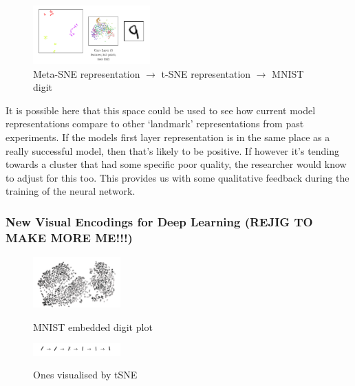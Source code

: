 \documentclass[a4paper,11pt,titlepage]{article}
\begin{document}
		\begin{figure}[H]
			\centering
						
    			\includegraphics[width=0.40\textwidth]{img/colah_meta_sne.png}
\caption{Meta-SNE representation $\rightarrow$ t-SNE representation $\rightarrow$ MNIST digit}
 		\end{figure}
 		
		It is possible here that this space could be used to see how current model representations compare to other `landmark' representations from past experiments. If the models first layer representation is in the same place as a really successful model, then that's likely to be positive. If however it's tending towards a cluster that had some specific poor quality, the researcher would know to adjust for this too. This provides us with some qualitative feedback during the training of the neural network. 
		

		
		
\subsubsection{New Visual Encodings for Deep 	Learning (REJIG TO MAKE MORE ME!!!)}
 			
	\begin{figure}[H]
    			\centering	
			{{\includegraphics[width=0.3\textwidth]
    				{img/hinton_embedded_tsne.png} 
    			}}%
    			\caption{MNIST embedded digit plot}%
    		\label{fig:mnistHinton}
	\end{figure}
 		
 	\begin{figure}[H]
    			\centering	
			{{\includegraphics[width=0.3\textwidth]
    				{img/colah_tsne_distribution.png} 
    			}}%
    			\caption{Ones visualised by tSNE}%
    		\label{fig:wiki}
	\end{figure}	  
 		
\end{document}
